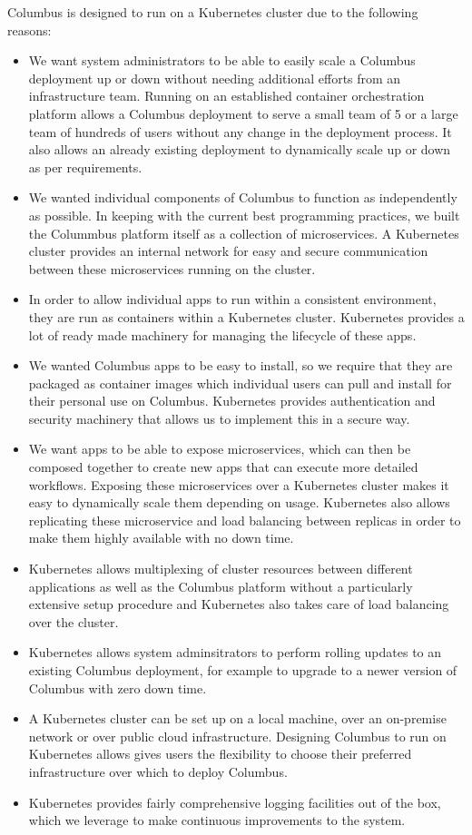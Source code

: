 Columbus is designed to run on a Kubernetes cluster due to the following reasons:
\begin{itemize}
  \item We want system administrators to be able to easily scale a Columbus deployment up or down 
    without needing additional efforts from an infrastructure team. Running on an established 
    container orchestration platform allows a Columbus deployment to serve a small team of 5 or a
    large team of hundreds of users without any change in the deployment process. It also allows
    an already existing deployment to dynamically scale up or down as per requirements.
  \item We wanted individual components of Columbus to function as independently as possible. In 
    keeping with the current best programming practices, we built the Colummbus platform itself as a 
    collection of microservices. A Kubernetes cluster provides an internal network for easy and 
    secure communication between these microservices running on the cluster.
  \item In order to allow individual apps to run within a consistent environment, they are run as
    containers within a Kubernetes cluster. Kubernetes provides a lot of ready made machinery for 
    managing the lifecycle of these apps.
  \item We wanted Columbus apps to be easy to install, so we require that they are packaged as
    container images which individual users can pull and install for their personal use on Columbus.
    Kubernetes provides authentication and security machinery that allows us to implement this in
    a secure way.
  \item We want apps to be able to expose microservices, which can then be composed together to 
    create new apps that can execute more detailed workflows. Exposing these microservices over a
    Kubernetes cluster makes it easy to dynamically scale them depending on usage. Kubernetes also
    allows replicating these microservice and load balancing between replicas in order to make them
    highly available with no down time.
  \item Kubernetes allows multiplexing of cluster resources between different applications as well
    as the Columbus platform without a particularly extensive setup procedure and Kubernetes also
    takes care of load balancing over the cluster.
  \item Kubernetes allows system adminsitrators to perform rolling updates to an existing Columbus
    deployment, for example to upgrade to a newer version of Columbus with zero down time.
  \item A Kubernetes cluster can be set up on a local machine, over an on-premise network or over
    public cloud infrastructure. Designing Columbus to run on Kubernetes allows gives users the 
    flexibility to choose their preferred infrastructure over which to deploy Columbus.
  \item Kubernetes provides fairly comprehensive logging facilities out of the box, which we
    leverage to make continuous improvements to the system.
\end{itemize}

